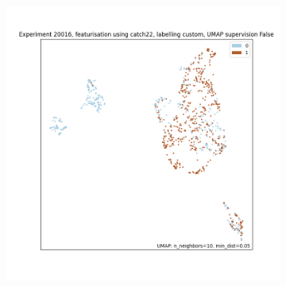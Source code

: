 

\begin{figure}
  \centering
  \begin{subfigure}[t]{0.7\textwidth}
  \centering
    \includegraphics[width=\linewidth]{Figure_15}
    \caption{
    }
    \label{fig:umap-osc}
  \end{subfigure}


\end{figure}

